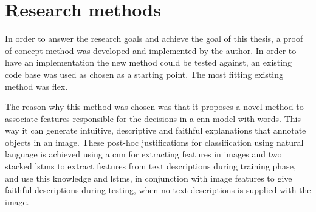 \label{sec:1_4_research_methods}

\begin{comment}
You are doing a research education, so it might be nice to show that you are aware of different ways of doing research. Here, you should describe your research methods showing the reader that you are conscious of your method. There exist several methodologies, and finding a reference somewhere would probably be good.
\end{comment}

\section{Research methods}

In order to answer the research goals and achieve the goal of this thesis, a proof of concept method was developed and implemented by the author. In order to have an implementation the new method could be tested against, an existing code base was used as chosen as a starting point. The most fitting existing method was \gls{flex}\cite{wickramanayakeFLEXFaithfulLinguistic2019}. 

The reason why this method was chosen was that it proposes a novel method to associate features responsible for the decisions in a \gls{cnn} model with words. This way it can generate intuitive, descriptive and faithful explanations that annotate objects in an image. These post-hoc justifications for classification using natural language is achieved using a \gls{cnn} for extracting features in images and two stacked \glspl{lstm} to extract features from text descriptions during training phase, and use this knowledge and \glspl{lstm}, in conjunction with image features to give faithful descriptions during testing, when no text descriptions is supplied with the image.

